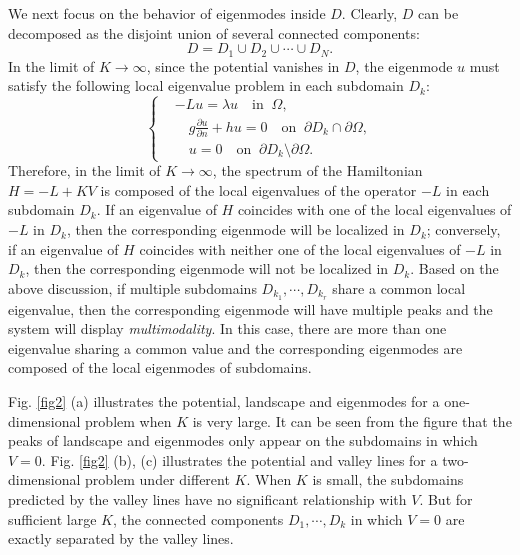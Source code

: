 \documentclass[a4paper,11pt]{article}
\begin{document}
We next focus on the behavior of eigenmodes inside $D$. Clearly, $D$ can be decomposed as the disjoint union of several connected components:
\begin{equation*}
D = D_1 \cup D_2 \cup \cdots \cup D_N.
\end{equation*}
In the limit of $K\rightarrow\infty$, since the potential vanishes in $D$, the eigenmode $u$ must satisfy the following local eigenvalue problem in each subdomain $D_k$:
\begin{equation}\label{subdomain}
\left\{
\begin{split}
& - L u = \lambda u \quad \textrm{in}\;\;\Omega, \\
& \quad g \frac{\partial u}{\partial n} + h u = 0 \quad \textrm{on}\;\;\partial D_k \cap \partial \Omega, \\
& \quad u = 0 \quad \textrm{on}\;\;\partial D_k \setminus \partial \Omega.
\end{split}
\right.
\end{equation}
Therefore, in the limit of $K \rightarrow \infty$, the spectrum of the Hamiltonian $H = - L + K V$ is composed of the local eigenvalues of the operator $-L$ in each subdomain $D_k$. If an eigenvalue of $H$ coincides with one of the local eigenvalues of $-L$ in $D_k$, then the corresponding eigenmode will be localized in $D_k$; conversely, if an eigenvalue of $H$ coincides with neither one of the local eigenvalues of $-L$ in $D_k$, then the corresponding eigenmode will not be localized in $D_k$. Based on the above discussion, if multiple subdomains $D_{k_1}, \cdots , D_{k_r}$ share a common local eigenvalue, then the corresponding eigenmode will have multiple peaks and the system will display \emph{multimodality}. In this case, there are more than one eigenvalue sharing a common value and the corresponding eigenmodes are composed of the local eigenmodes of subdomains.

Fig. \ref{fig2} (a) illustrates the potential, landscape and eigenmodes for a one-dimensional problem when $K$ is very large. It can be seen from the figure that the peaks of landscape and eigenmodes only appear on the subdomains in which $V = 0$. Fig. \ref{fig2} (b), (c) illustrates the potential and valley lines for a two-dimensional problem under different $K$. When $K$ is small, the subdomains predicted by the valley lines have no significant relationship with $V$. But for sufficient large $K$, the connected components $D_1, \cdots, D_k$ in which $V = 0$ are exactly separated by the valley lines. 
\end{document}
